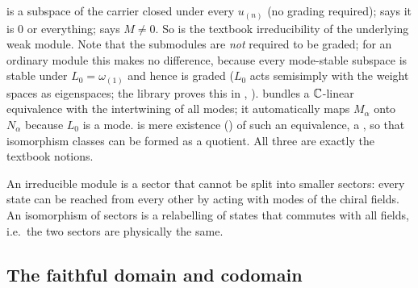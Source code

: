 \begin{dictionary}
 is a subspace of the carrier closed under every $u_{(n)}$ (no grading
required);  says it is $0$ or everything;  says $M\neq0$. So
 is the textbook irreducibility of the underlying weak module. Note that the submodules are
\emph{not} required to be graded; for an ordinary module this makes no difference, because every mode-stable subspace is
stable under $L_0 = \omega_{(1)}$ and hence is graded ($L_0$ acts semisimply with the weight spaces as eigenspaces;
the library proves this in , ).
 bundles a ${\mathbb{C}}$-linear equivalence with the intertwining of all modes; it automatically maps
$M_\alpha$ onto $N_\alpha$ because $L_0$ is a mode.  is mere existence () of such an
equivalence, a , so that isomorphism classes can be formed as a quotient. All three are exactly the textbook
notions.
\end{dictionary}

\begin{physics}
An irreducible module is a sector that cannot be split into smaller sectors: every state can be reached from every other
by acting with modes of the chiral fields. An isomorphism of sectors is a relabelling of states that commutes with all
fields, i.e.\ the two sectors are physically the same.
\end{physics}

\subsection{The faithful domain and codomain}

